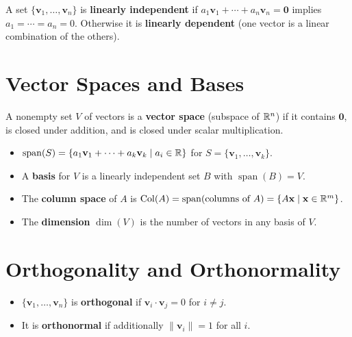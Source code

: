 \begin{definition}
A set $\{\mathbf{v}_1,\ldots,\mathbf{v}_n\}$ is \textbf{linearly independent} if $a_1\mathbf{v}_1+\cdots+a_n\mathbf{v}_n=\mathbf{0}$ implies $a_1=\cdots=a_n=0$. Otherwise it is \textbf{linearly dependent} (one vector is a linear combination of the others).
\end{definition}

\section{Vector Spaces and Bases}

\begin{definition}
A nonempty set $V$ of vectors is a \textbf{vector space} (subspace of $\mathbb{R}^n$) if it contains $\mathbf{0}$, is closed under addition, and is closed under scalar multiplication.
\end{definition}

\begin{definition}
\mbox{}
\begin{itemize}
  \item $\operatorname{span}(S) = \{a_1\mathbf{v}_1+\cdots+a_k\mathbf{v}_k \mid a_i\in\mathbb{R}\}$ for $S=\{\mathbf{v}_1,\ldots,\mathbf{v}_k\}$.
  \item A \textbf{basis} for $V$ is a linearly independent set $B$ with $\operatorname{span}(B)=V$.
  \item The \textbf{column space} of $A$ is $\operatorname{Col}(A)=\operatorname{span}(\text{columns of }A)=\{A\mathbf{x}\mid\mathbf{x}\in\mathbb{R}^m\}$.
  \item The \textbf{dimension} $\dim(V)$ is the number of vectors in any basis of $V$.
\end{itemize}
\end{definition}

\section{Orthogonality and Orthonormality}

\begin{definition}
\mbox{}
\begin{itemize}
  \item $\{\mathbf{v}_1,\ldots,\mathbf{v}_n\}$ is \textbf{orthogonal} if $\mathbf{v}_i\cdot\mathbf{v}_j=0$ for $i\neq j$.
  \item It is \textbf{orthonormal} if additionally $\|\mathbf{v}_i\|=1$ for all $i$.
\end{itemize}
\end{definition}

